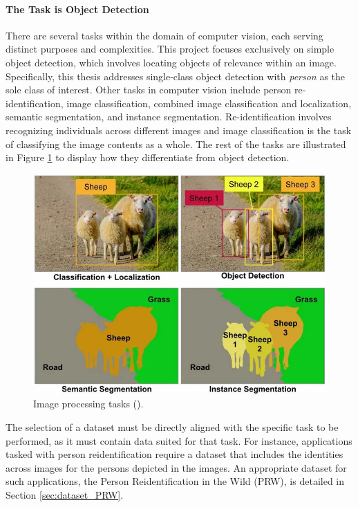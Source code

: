 \paragraph{The Task is Object Detection}
\label{sec:scope_object_detection}
There are several tasks within the domain of computer vision, each serving distinct purposes and complexities. This project focuses exclusively on simple object detection, which involves locating objects of relevance within an image. Specifically, this thesis addresses single-class object detection with \textit{person} as the sole class of interest. Other tasks in computer vision include person re-identification, image classification, combined image classification and localization, semantic segmentation, and instance segmentation. Re-identification involves recognizing individuals across different images and image classification is the task of classifying the image contents as a whole. The rest of the tasks are illustrated in Figure \ref{fig:computer_vision_tasks} to display how they differentiate from object detection. 

\begin{figure}[H]
    \centering
    \includegraphics[width=0.6\linewidth]{Images/computer_vision_tasks.png}
    \caption{Image processing tasks (\cite{mu2021object_detection_operations}).}
    \label{fig:computer_vision_tasks}
\end{figure}

The selection of a dataset must be directly aligned with the specific task to be performed, as it must contain data suited for that task. For instance, applications tasked with person reidentification require a dataset that includes the identities across images for the persons depicted in the images. An appropriate dataset for such applications, the Person Reidentification in the Wild (PRW), is detailed in Section \ref{sec:dataset_PRW}.

